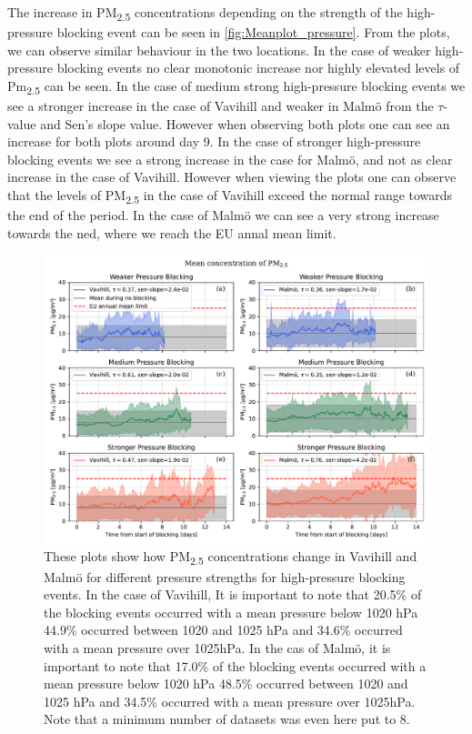 The increase in PM\textsubscript{2.5} concentrations depending on the strength of the high-pressure blocking event can be seen in \autoref{fig:Meanplot_pressure}. From the plots, we can observe similar behaviour in the two locations. In the case of weaker high-pressure blocking events no clear monotonic increase nor highly elevated levels of Pm\textsubscript{2.5} can be seen. In the case of medium strong high-pressure blocking events we see a stronger increase in the case of Vavihill and weaker in Malmö from the $\tau$-value and Sen's slope value. However when observing both plots one can see an increase for both plots around day 9. In the case of stronger high-pressure blocking events we see a strong increase in the case for Malmö, and not as clear increase in the case of Vavihill. However when viewing the plots one can observe that the levels of PM\textsubscript{2.5} in the case of Vavihill exceed the normal range towards the end of the period. In the case of Malmö we can see a very strong increase towards the ned, where we reach the EU annal mean limit. 

\begin{figure}[H]
    \centering
    \includegraphics[width=\textwidth]{Figures/Meanplot_pressure.pdf}
    \caption{These plots show how PM\textsubscript{2.5} concentrations change in Vavihill and Malmö for different pressure strengths for high-pressure blocking events. In the case of Vavihill, It is important to note that 20.5\% of the blocking events occurred with a mean pressure below 1020 hPa 44.9\% occurred between 1020 and 1025 hPa and 34.6\% occurred with a mean pressure over 1025hPa. In the cas of Malmö, it is important to note that 17.0\% of the blocking events occurred with a mean pressure below 1020 hPa 48.5\% occurred between 1020 and 1025 hPa and 34.5\% occurred with a mean pressure over 1025hPa. Note that a minimum number of datasets was even here put to 8.}
    \label{fig:Meanplot_pressure}
\end{figure}

